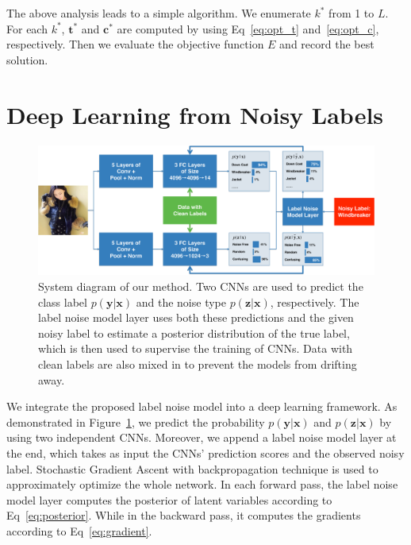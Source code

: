 \documentclass[10pt,twocolumn,letterpaper]{article}
\def\vec{\mathbf}
\begin{document}
The above analysis leads to a simple algorithm. We enumerate $k^*$ from 1 to $L$. For each $k^*$, $\vec{t}^*$ and $\vec{c}^*$ are computed by using Eq~\eqref{eq:opt_t} and~\eqref{eq:opt_c}, respectively. Then we evaluate the objective function $E$ and record the best solution.




\section{Deep Learning from Noisy Labels} %
\label{sec:deep_learning_from_noisy_labels}

\begin{figure}
\begin{center}
\includegraphics[width=1.0\linewidth]{figure/diagram.pdf}
\end{center}
\caption{System diagram of our method. Two CNNs are used to predict the class label $p(\vec{y}|\vec{x})$ and the noise type $p(\vec{z}|\vec{x})$, respectively. The label noise model layer uses both these predictions and the given noisy label to estimate a posterior distribution of the true label, which is then used to supervise the training of CNNs. Data with clean labels are also mixed in to prevent the models from drifting away.}
\label{fig:framework}
\end{figure}

We integrate the proposed label noise model into a deep learning framework. As demonstrated in Figure~\ref{fig:framework}, we predict the probability $p(\vec{y}|\vec{x})$ and $p(\vec{z}|\vec{x})$ by using two independent CNNs. Moreover, we append a label noise model layer at the end, which takes as input the CNNs' prediction scores and the observed noisy label. Stochastic Gradient Ascent with backpropagation technique is used to approximately optimize the whole network. In each forward pass, the label noise model layer computes the posterior of latent variables according to Eq~\eqref{eq:posterior}. While in the backward pass, it computes the gradients according to Eq~\eqref{eq:gradient}.
\end{document}
